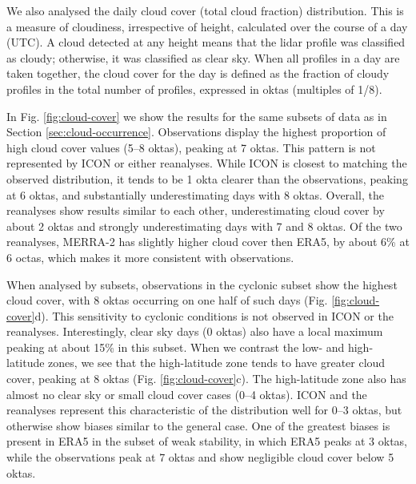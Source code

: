 \documentclass[12pt,a4paper]{article}
\begin{document}
We also analysed the daily cloud cover (total cloud fraction) distribution.
This is a measure of cloudiness, irrespective of height, calculated over the
course of a day (UTC). A cloud detected at any height means that the lidar
profile was classified as cloudy; otherwise, it was classified as clear sky.
When all profiles in a day are taken together, the cloud cover for the day is
defined as the fraction of cloudy profiles in the total number of profiles,
expressed in oktas (multiples of 1/8).

In Fig.  \ref{fig:cloud-cover} we show the results for the same subsets of data
as in Section \ref{sec:cloud-occurrence}. Observations display the highest
proportion of high cloud cover values (5--8 oktas), peaking at 7 oktas. This
pattern is not represented by ICON or either reanalyses.  While ICON is closest
to matching the observed distribution, it tends to be 1 okta clearer than the
observations, peaking at 6 oktas, and substantially underestimating days with 8
oktas.  Overall, the reanalyses show results similar to each other,
underestimating cloud cover by about 2 oktas and strongly underestimating days
with 7 and 8 oktas. Of the two reanalyses, MERRA-2 has slightly higher cloud
cover then ERA5, by about 6\% at 6 octas, which makes it more consistent with
observations.

When analysed by subsets, observations in the cyclonic subset show the highest
cloud cover, with 8 oktas occurring on one half of such days (Fig.
\ref{fig:cloud-cover}d).  This sensitivity to cyclonic conditions is not
observed in ICON or the reanalyses. Interestingly, clear sky days (0 oktas)
also have a local maximum peaking at about 15\% in this subset.  When we
contrast the low- and high-latitude zones, we see that the high-latitude zone
tends to have greater cloud cover, peaking at 8 oktas (Fig.
\ref{fig:cloud-cover}c). The high-latitude zone also has almost no clear sky or
small cloud cover cases (0--4 oktas). ICON and the reanalyses represent this
characteristic of the distribution well for 0--3 oktas, but otherwise show
biases similar to the general case. One of the greatest biases is present in
ERA5 in the subset of weak stability, in which ERA5 peaks at 3 oktas, while the
observations peak at 7 oktas and show negligible cloud cover below 5 oktas.
\end{document}
